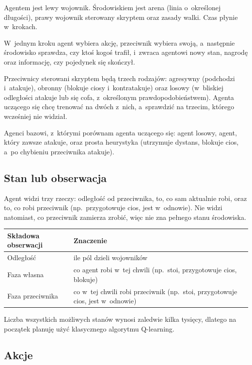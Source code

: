 \documentclass[12pt]{article}
\begin{document}
Agentem jest lewy wojownik. Środowiskiem jest arena (linia o~określonej długości), prawy wojownik sterowany skryptem oraz zasady walki. Czas płynie w~krokach.

W~jednym kroku agent wybiera akcję, przeciwnik wybiera swoją, a~następnie środowisko sprawdza, czy ktoś kogoś trafił, i~zwraca agentowi nowy stan, nagrodę oraz informację, czy pojedynek się skończył.

Przeciwnicy sterowani skryptem będą trzech rodzajów: agresywny (podchodzi i~atakuje), obronny (blokuje ciosy i~kontratakuje) oraz losowy (w~bliskiej odległości atakuje lub się cofa, z~określonym prawdopodobieństwem). Agenta uczącego się chcę trenować na dwóch z~nich, a~sprawdzić na trzecim, którego wcześniej nie widział.

Agenci bazowi, z~którymi porównam agenta uczącego się: agent losowy, agent, który zawsze atakuje, oraz prosta heurystyka (utrzymuje dystans, blokuje cios, a~po chybieniu przeciwnika atakuje).

\subsection{Stan lub obserwacja}

Agent widzi trzy rzeczy: odległość od przeciwnika, to, co sam aktualnie robi, oraz to, co robi przeciwnik (np.\ przygotowuje cios, jest w~odnowie). Nie widzi natomiast, co przeciwnik zamierza zrobić, więc nie zna pełnego stanu środowiska.

\begin{center}
\begin{tabular}{p{}p{}}
\toprule
Składowa obserwacji & Znaczenie \\
\midrule
Odległość & ile pól dzieli wojowników \\
Faza własna & co agent robi w~tej chwili (np.\ stoi, przygotowuje cios, blokuje) \\
Faza przeciwnika & co w~tej chwili robi przeciwnik (np.\ stoi, przygotowuje cios, jest w~odnowie) \\
\bottomrule
\end{tabular}
\end{center}

Liczba wszystkich możliwych stanów wynosi zaledwie kilka tysięcy, dlatego na początek planuję użyć klasycznego algorytmu Q-learning.

\subsection{Akcje}
\end{document}
